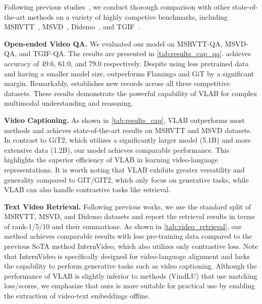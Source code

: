 \documentclass{article}
\begin{document}
Following previous studies~\cite{wang2022git,li2022lavender}, we conduct thorough comparison with other state-of-the-art methods on a variety of highly competive benchmarks, including MSRVTT~\cite{xu2016msr}, MSVD~\cite{xu2017video}, Didemo~\cite{anne2017localizing}, and TGIF~\cite{jang2017tgif}.

\noindent\textbf{Open-ended Video QA.}
We evaluated our model on MSRVTT-QA, MSVD-QA, and TGIF-QA. The results are presented in \cref{tab:results_cap_qa}.  achieves accuracy of 49.6, 61.0, and 79.0 respectively. Despite using less pretrained data and having a smaller model size,  outperforms Flamingo and GiT by a significant margin. Remarkably,  establishes new records across all three competitive datasets. These results demonstrate the powerful capability of VLAB for complex multimodal understanding and reasoning.

\noindent\textbf{Video Captioning.}
As shown in \cref{tab:results_cap}, VLAB outperforms most methods and achieves state-of-the-art results on MSRVTT and MSVD datasets. In contrast to GiT2, which utilizes a significantly larger model (5.1B) and more extensive data (1.2B), our model achieves comparable performance. This highlights the superior efficiency of VLAB in learning video-language representations. It is worth noting that VLAB exhibits greater versatility and generality compared to GIT/GIT2, which only focus on generative tasks, while VLAB can also handle contrastive tasks like retrieval.

\noindent\textbf{Text Video Retrieval.}
Following previous works, we use the standard split of MSRVTT, MSVD, and Didemo datasets and report the retrieval results in terms of rank-1/5/10 and their summations. As shown in \cref{tab:video_retrieval}, our method achieves comparable results with less pre-training data compared to the previous SoTA method InternVideo, which also utilizes only contrastive loss. Note that InternVideo is specifically designed for video-language alignment and lacks the capability to perform generative tasks such as video captioning. Although the performance of VLAB is slightly inferior to methods (VindLU) that use matching loss/scores, we emphasize that ours is more suitable for practical use by enabling the extraction of video-text embeddings offline.
\end{document}
